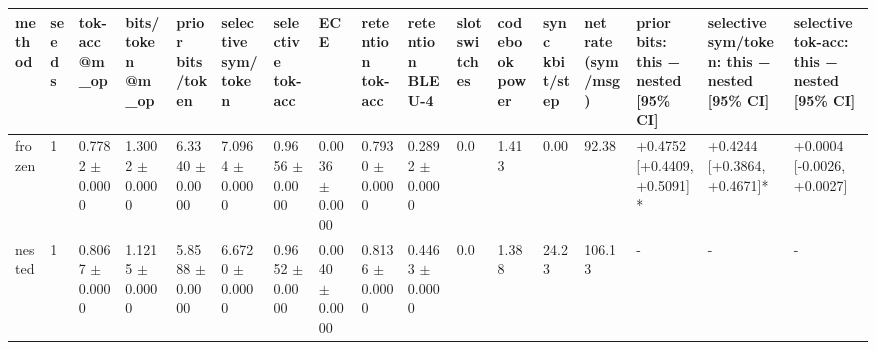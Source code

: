 \begin{tabular}{lllllllllllllllll}
\hline
method & seeds & tok-acc @m\_op & bits/token @m\_op & prior bits/token & selective sym/token & selective tok-acc & ECE & retention tok-acc & retention BLEU-4 & slot switches & codebook power & sync kbit/step & net rate (sym/msg) & prior bits: this − nested [95\% CI] & selective sym/token: this − nested [95\% CI] & selective tok-acc: this − nested [95\% CI] \\
\hline
frozen & 1 & 0.7782 $\pm$ 0.0000 & 1.3002 $\pm$ 0.0000 & 6.3340 $\pm$ 0.0000 & 7.0964 $\pm$ 0.0000 & 0.9656 $\pm$ 0.0000 & 0.0036 $\pm$ 0.0000 & 0.7930 $\pm$ 0.0000 & 0.2892 $\pm$ 0.0000 & 0.0 & 1.413 & 0.00 & 92.38 & +0.4752 [+0.4409, +0.5091]* & +0.4244 [+0.3864, +0.4671]* & +0.0004 [-0.0026, +0.0027] \\
nested & 1 & 0.8067 $\pm$ 0.0000 & 1.1215 $\pm$ 0.0000 & 5.8588 $\pm$ 0.0000 & 6.6720 $\pm$ 0.0000 & 0.9652 $\pm$ 0.0000 & 0.0040 $\pm$ 0.0000 & 0.8136 $\pm$ 0.0000 & 0.4463 $\pm$ 0.0000 & 0.0 & 1.388 & 24.23 & 106.13 & - & - & - \\
\hline
\end{tabular}
